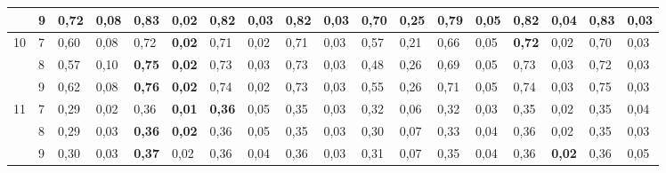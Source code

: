 \documentclass[conference]{IEEEtran}
\begin{document}
\begin{table}[]
\begin{tabular}{|cl|ll|ll|ll|ll|ll|ll|ll|ll|}
		\multicolumn{1}{|c|}{} & 9 & \multicolumn{1}{l|}{0,72} & 0,08 & \multicolumn{1}{l|}{\textbf{0,83}} & \textbf{0,02} & \multicolumn{1}{l|}{0,82} & 0,03 & \multicolumn{1}{l|}{0,82} & 0,03 & \multicolumn{1}{l|}{0,70} & 0,25 & \multicolumn{1}{l|}{0,79} & 0,05 & \multicolumn{1}{l|}{0,82} & 0,04 & \multicolumn{1}{l|}{0,83} & 0,03 \\ \hline
		\multicolumn{1}{|c|}{\multirow{3}{*}{10}} & 7 & \multicolumn{1}{l|}{0,60} & 0,08 & \multicolumn{1}{l|}{0,72} & \textbf{0,02} & \multicolumn{1}{l|}{0,71} & 0,02 & \multicolumn{1}{l|}{0,71} & 0,03 & \multicolumn{1}{l|}{0,57} & 0,21 & \multicolumn{1}{l|}{0,66} & 0,05 & \multicolumn{1}{l|}{\textbf{0,72}} & 0,02 & \multicolumn{1}{l|}{0,70} & 0,03 \\ \cline{2-18} 
		\multicolumn{1}{|c|}{} & 8 & \multicolumn{1}{l|}{0,57} & 0,10 & \multicolumn{1}{l|}{\textbf{0,75}} & \textbf{0,02} & \multicolumn{1}{l|}{0,73} & 0,03 & \multicolumn{1}{l|}{0,73} & 0,03 & \multicolumn{1}{l|}{0,48} & 0,26 & \multicolumn{1}{l|}{0,69} & 0,05 & \multicolumn{1}{l|}{0,73} & 0,03 & \multicolumn{1}{l|}{0,72} & 0,03 \\ \cline{2-18} 
		\multicolumn{1}{|c|}{} & 9 & \multicolumn{1}{l|}{0,62} & 0,08 & \multicolumn{1}{l|}{\textbf{0,76}} & \textbf{0,02} & \multicolumn{1}{l|}{0,74} & 0,02 & \multicolumn{1}{l|}{0,73} & 0,03 & \multicolumn{1}{l|}{0,55} & 0,26 & \multicolumn{1}{l|}{0,71} & 0,05 & \multicolumn{1}{l|}{0,74} & 0,03 & \multicolumn{1}{l|}{0,75} & 0,03 \\ \hline
		\multicolumn{1}{|c|}{\multirow{3}{*}{11}} & 7 & \multicolumn{1}{l|}{0,29} & 0,02 & \multicolumn{1}{l|}{0,36} & \textbf{0,01} & \multicolumn{1}{l|}{\textbf{0,36}} & 0,05 & \multicolumn{1}{l|}{0,35} & 0,03 & \multicolumn{1}{l|}{0,32} & 0,06 & \multicolumn{1}{l|}{0,32} & 0,03 & \multicolumn{1}{l|}{0,35} & 0,02 & \multicolumn{1}{l|}{0,35} & 0,04 \\ \cline{2-18} 
		\multicolumn{1}{|c|}{} & 8 & \multicolumn{1}{l|}{0,29} & 0,03 & \multicolumn{1}{l|}{\textbf{0,36}} & \textbf{0,02} & \multicolumn{1}{l|}{0,36} & 0,05 & \multicolumn{1}{l|}{0,35} & 0,03 & \multicolumn{1}{l|}{0,30} & 0,07 & \multicolumn{1}{l|}{0,33} & 0,04 & \multicolumn{1}{l|}{0,36} & 0,02 & \multicolumn{1}{l|}{0,35} & 0,03 \\ \cline{2-18} 
		\multicolumn{1}{|c|}{} & 9 & \multicolumn{1}{l|}{0,30} & 0,03 & \multicolumn{1}{l|}{\textbf{0,37}} & 0,02 & \multicolumn{1}{l|}{0,36} & 0,04 & \multicolumn{1}{l|}{0,36} & 0,03 & \multicolumn{1}{l|}{0,31} & 0,07 & \multicolumn{1}{l|}{0,35} & 0,04 & \multicolumn{1}{l|}{0,36} & \textbf{0,02} & \multicolumn{1}{l|}{0,36} & 0,05 \\ \hline

\end{tabular}
\end{table}
\end{document}
